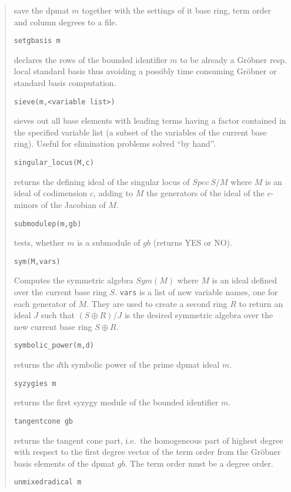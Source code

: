 \documentclass[a4paper,11pt]{article}
\newcommand{\gr}{Gr\"obner}
\newcommand{\pbx}[1]{\mbox{}\hfill \parbox[t]{12cm}{#1} \pagebreak[3]}
\begin{document}
\begin{quote}
\pbx{save the dpmat $m$ together with the settings of it base ring,
term order and column degrees to a file.}

\verb|setgbasis m| 

\pbx{declares the rows of the bounded identifier $m$ to be already a
{\gr} resp. local standard basis thus avoiding a possibly time
consuming {\gr} or standard basis computation.}

\verb|sieve(m,<variable list>)| 

\pbx{sieves out all base elements with leading terms having a factor
contained in the specified variable list (a subset of the variables
of the current base ring). Useful for elimination problems solved
``by hand''.}

\verb|singular_locus(M,c)| 

\pbx{returns the defining ideal of the singular locus of $Spec\ S/M$
where $M$ is an ideal of codimension $c$, adding to $M$ the generators
of the ideal of the $c$-minors of the Jacobian of $M$.}

\verb|submodulep(m,gb)| 

\pbx{tests, whether $m$ is a submodule of $gb$ (returns YES or NO).}

\verb|sym(M,vars)|

\pbx{Computes the symmetric algebra $Sym(M)$ where $M$ is an ideal
defined over the current base ring $S$. {\tt vars} is a list of new
variable names, one for each generator of $M$. They are used to create
a second ring $R$ to return an ideal $J$ such that $(S\oplus R)/J$ is
the desired symmetric algebra over the new current base ring $S\oplus
R$.}
       
\verb|symbolic_power(m,d)| 

\pbx{returns the $d$th symbolic power of the prime dpmat ideal $m$.} 

\verb|syzygies m| 

\pbx{returns the first syzygy module of the bounded identifier $m$.}

\verb|tangentcone gb| 

\pbx{returns the tangent cone part, i.e.\ the homogeneous part of
highest degree with respect to the first degree vector of the term
order from the {\gr} basis elements of the dpmat $gb$. The term order
must be a degree order.}

\verb|unmixedradical m| 


\end{quote}
\end{document}
